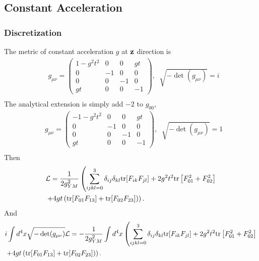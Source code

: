\subsection{\label{sec:ConstantAcceleration}Constant Acceleration}

\subsubsection{\label{sec:discretizationAcceleration}Discretization}

The metric of constant acceleration $g$ at ${\bf z}$ direction is
\begin{equation}
\begin{split}
&g_{\mu\nu}=\left(\begin{array}{cccc} 1-g^2 t^2 & 0 & 0 & g t \\ 0 & -1 & 0 & 0 \\ 0 & 0 & -1 & 0 \\ g t & 0 & 0 & -1 \end{array}\right),\;\;\sqrt{-\det (g_{\mu\nu})}=i\\
\end{split}
\end{equation}
The analytical extension is simply add $-2$ to $g_{00}$, \begin{equation}
\begin{split}
&g_{\mu\nu}=\left(\begin{array}{cccc} -1-g^2 t^2 & 0 & 0 & g t \\ 0 & -1 & 0 & 0 \\ 0 & 0 & -1 & 0 \\ g t & 0 & 0 & -1 \end{array}\right),\;\;\sqrt{-\det (g_{\mu\nu})}=1\\
\end{split}
\end{equation}
Then
\begin{equation}
\begin{split}
&\mathcal{L}=\frac{1}{2g_{YM}^2}\left(\sum _{ijkl=0}^3 \delta_{ij}\delta_{kl}{\rm tr}[F_{ik}F_{jl}]+2g^2 t^2 {\rm tr}\left[F_{01}^2+F_{02}^2\right]\right.\\
&\left.+4g t\left({\rm tr}[F_{01}F_{13}]+{\rm tr}[F_{02}F_{23}]\right)\right).
\end{split}
\end{equation}
And
\begin{equation}
\begin{split}
&i\int d^4 x \sqrt{-\det (g_{\mu\nu})}\mathcal{L}=-\frac{1}{2g_{YM}^2}\int d^4x \left(\sum _{ijkl=0}^3 \delta_{ij}\delta_{kl}{\rm tr}[F_{ik}F_{jl}]+2g^2 t^2 {\rm tr}\left[F_{01}^2+F_{02}^2\right]\right.\\
&\left.+4g t\left({\rm tr}[F_{01}F_{13}]+{\rm tr}[F_{02}F_{23}]\right)\right).
\end{split}
\end{equation}
